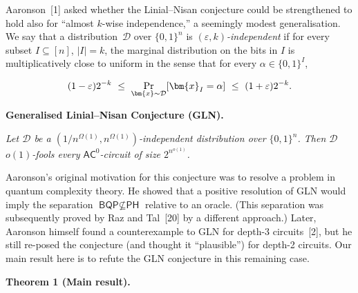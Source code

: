 \documentclass[10pt,a4paper]{article}
\begin{document}
Aaronson [1] asked whether the Linial–Nisan conjecture could be strengthened to hold also for “almost $k$-wise independence,” a seemingly modest generalisation. We say that a distribution $\mathcal{D}$ over $\{0,1\}^{n}$ is \emph{$(\varepsilon,k)$-independent} if for every subset $I\subseteq[n]$, $|I|=k$, the marginal distribution on the bits in $I$ is multiplicatively close to uniform in the sense that for every $\alpha\in\{0,1\}^{I}$,\par


\[\begin{gathered}
(1-\varepsilon)2^{-k}\nobreak\ \leq\nobreak\ \Pr\limits_{\bm{x}\sim\mathcal{D}}[\bm{x}_{I}=\alpha]\nobreak\ \leq\nobreak\ (1+\varepsilon)2^{-k}.
\end{gathered}\]





\par\medskip\noindent\textbf{
\textbf{Generalised Linial–Nisan Conjecture (GLN)}\textbf{.}
}\par



\emph{Let $\mathcal{D}$ be a $(1/n^{\Omega(1)},n^{\Omega(1)})$-independent distribution over $\{0,1\}^{n}$. Then $\mathcal{D}$ $o(1)$-fools every $\textsf{AC}^{0}$-circuit of size $2^{n^{o(1)}}$.}\par






Aaronson’s original motivation for this conjecture was to resolve a problem in quantum complexity theory. He showed that a positive resolution of GLN would imply the separation $\textsf{BQP}\nsubseteq\textsf{PH}$ relative to an oracle. (This separation was subsequently proved by Raz and Tal [20] by a different approach.) Later, Aaronson himself found a counterexample to GLN for depth-3 circuits [2], but he still re-posed the conjecture (and thought it “plausible”) for depth-2 circuits. Our main result here is to refute the GLN conjecture in this remaining case.\par






\par\medskip\noindent\textbf{
\textbf{Theorem 1}\textbf{ }(Main result)\textbf{.}
}\par
\end{document}

